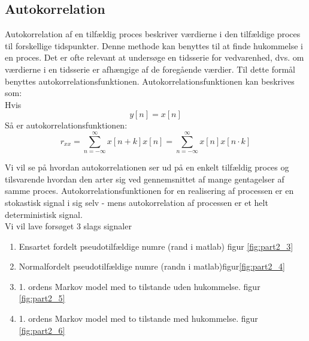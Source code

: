 \subsection{Autokorrelation}
Autokorrelation af en tilfældig proces beskriver værdierne i den tilfældige proces til forskellige tidspunkter. Denne methode kan benyttes til at finde hukommelse i en proces. 
Det er ofte relevant at undersøge en tidsserie for vedvarenhed, dvs. om værdierne i en tidsserie er afhængige af de foregående værdier. Til dette formål benyttes autokorrelationsfunktionen.
Autokorrelationsfunktionen kan beskrives som:\\
Hvis
\begin{equation}
 y[n] = x[n]
\end{equation}
Så er autokorrelationsfunktionen: 
\begin{equation}
r_{xx}=\sum_{n = - \infty}^{\infty}x[n+k]x[n]=\sum^{\infty}_{n = -\infty}x[n]x[n\cdot k] 
\end{equation}

Vi vil se på hvordan autokorrelationen ser ud på en enkelt tilfældig proces og tilsvarende hvordan den arter sig ved 
gennemsnittet af mange gentagelser af samme proces.
Autokorrelationsfunktionen for en realisering af processen er en stokastisk signal i sig selv - mens autokorrelation af processen er et helt deterministisk signal.\\


Vi vil lave forsøget 3 slags signaler  

\begin{enumerate}
	\item Ensartet fordelt pseudotilfældige numre (rand i matlab)   figur \ref{fig:part2_3}
	\item Normalfordelt pseudotilfældige numre (randn i matlab)figur\ref {fig:part2_4}
	\item 1. ordens Markov model med to tilstande uden hukommelse. figur \ref{fig:part2_5}
	\item 1. ordens Markov model med to tilstande med hukommelse. figur \ref{fig:part2_6} 
\end{enumerate}

